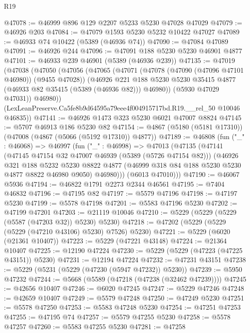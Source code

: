 \begin{lexlean}{R19}
\begin{coremodule}
@47078 := @46999 @896 @129 @2207 @5233 @5230 @47028 @47029
@47079 := @46926 @203
@47084 := @47079 @1593 @5230 @5232 @10422 @47027
@47089 := @46933 @74 @10422 (@5389 (@46936 @74))
@47090 := @47084 @47089
@47091 := @46926 @244
@47096 := @47091 @188 @5230 @5230 @46901 @4877
@47101 := @46933 @239 @46901 (@5389 (@46936 @239))
@47135 := @47019
    (@47038
      (@47050
        (@47056
          (@47065
            (@47071
              (@47078 (@47090 (@47096 @47101 @46980)) (@9455 @47028))
              (@46926
                @221
                @188
                @5230
                @5230
                @35415
                @4877
                (@46933 @82 @35415 (@5389 (@46936 @82)))
                @46980))
            (@5930 @47029 @47031))
          @46980))
      (LexLeanPreserve.Ca5fe8b9d64595a79eee4f004915717bd.R19.__rel_50 @10046 @46835))
@47141 := @46926 @1473 @323 @5230 @6021 @47007 @8824
@47145 := @5707 @46913 @186 @5230 @82
@47154 := @4867 (@5180 (@5181 @17310)) (@47008 (@4867 (@5066 (@5192 @17310)) @4877))
@47189 := @46808
    (fun ("_" : @46068) =>
    @46997
      (fun ("_" : @46998) =>
      @47013
        (@47135
          (@47141
            (@47145 @47154 @32 @47007 @46939 (@5389 (@5726 @47154 @82)))
            (@46926
              @321
              @188
              @5232
              @5230
              @8822
              @4877
              (@46999 @318 @84 @188 @5230 @5230 @4877 @8822 @46980 @9050)
              @46980)))
        (@6013 @47010)))
@47190 := @46067 @5936
@47194 := @46822 @1791 @2273 @2344 @46561
@47195 := @7404 @46832
@47196 := @47195 @82
@47197 := @5579 @47196
@47198 := @47197 @5230
@47199 := @5578 @47198
@47201 := @5583 @47196 @5230
@47202 := @47199 @47201
@47203 := @21119 @10046
@47210 := @5229 (@5229 (@5229 (@5587 (@47203 @32)) @5230) @5230)
@47218 := @47202 (@5229 (@5229 (@5229 (@47210 @43106) @5230) @7526) @5230)
@47221 := @5229 (@6020 (@21361 @10407))
@47223 := @5229 (@47221 @43148)
@47224 := @21364 @10407
@47225 := @12190 @47224
@47230 := @5229 (@5229 (@47223 (@47225 @43151)) @5230)
@47231 := @12194 @47224
@47232 := @47231 @43151
@47238 := @5229 (@5231 (@5229 (@47230 (@5947 @47232)) @5230))
@47239 := @5950 @47232
@47244 := @5668 (@5589 (@47218 (@47238 (@32462 @47239))))
@47245 := @42656 @10407
@47246 := @6020 @47245
@47247 := @5229 @47246
@47248 := @42659 @10407
@47249 := @5579 @47248
@47250 := @47249 @5230
@47251 := @5578 @47250
@47253 := @5583 @47248 @5230
@47254 := @47251 @47253
@47255 := @47195 @74
@47257 := @5579 @47255 @5230
@47258 := @5578 @47257
@47260 := @5583 @47255 @5230
@47281 := @47258

\end{coremodule}
\end{lexlean}
